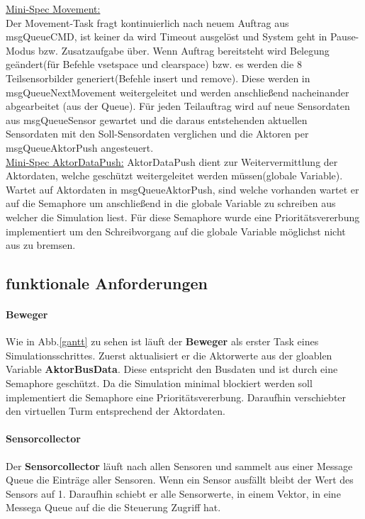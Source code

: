 \underline{Mini-Spec Movement:}\\
Der Movement-Task fragt kontinuierlich nach neuem Auftrag aus msgQueueCMD, ist keiner da wird Timeout ausgelöst und System geht in Pause-Modus bzw. Zusatzaufgabe über. Wenn Auftrag bereitsteht wird Belegung geändert(für Befehle vsetspace und clearspace) bzw. es werden die 8 Teilsensorbilder generiert(Befehle insert und remove). Diese werden in msgQueueNextMovement weitergeleitet und werden anschließend nacheinander abgearbeitet (aus der Queue). Für jeden Teilauftrag wird auf neue Sensordaten aus msgQueueSensor gewartet und die daraus entstehenden aktuellen Sensordaten mit den Soll-Sensordaten verglichen und die Aktoren per msgQueueAktorPush angesteuert. \\

\underline{Mini-Spec AktorDataPush:}
AktorDataPush dient zur Weitervermittlung der Aktordaten, welche geschützt weitergeleitet werden müssen(globale Variable).
Wartet auf Aktordaten in msgQueueAktorPush, sind welche vorhanden wartet er auf die Semaphore um anschließend in die globale Variable zu schreiben aus welcher die Simulation liest. Für diese Semaphore wurde eine Prioritätsvererbung implementiert um den Schreibvorgang auf die globale Variable möglichst nicht aus zu bremsen. \\


\subsection {funktionale Anforderungen}

\paragraph{Beweger}
Wie in Abb.\ref{gantt} zu sehen ist läuft der \textbf{Beweger} als erster Task eines Simulationsschrittes. Zuerst aktualisiert er die Aktorwerte aus der gloablen Variable \textbf{AktorBusData}. Diese entspricht den Busdaten und ist durch eine Semaphore geschützt. Da die Simulation minimal blockiert werden soll implementiert die Semaphore eine Prioritätsvererbung. Daraufhin \glqq verschiebt\grqq   er den virtuellen Turm entsprechend der Aktordaten.

\paragraph{Sensorcollector}
Der \textbf{Sensorcollector} läuft nach allen Sensoren und sammelt  aus einer Message Queue die Einträge aller Sensoren. Wenn ein Sensor ausfällt bleibt der Wert des Sensors auf 1. Daraufhin schiebt er alle Sensorwerte, in einem Vektor, in eine Messega Queue auf die die Steuerung Zugriff hat.


